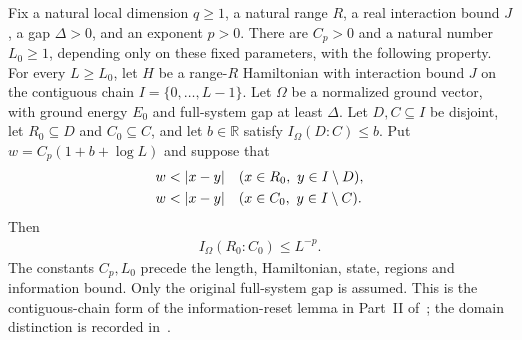 \begin{lemma}
    \label{thm:chain_information_reset}
    \leanok
    Fix a natural local dimension $q\ge1$, a natural range $R$, a real
    interaction bound $J$, a gap $\Delta>0$, and an exponent $p>0$.
    There are $C_p>0$ and a natural number $L_0\ge1$, depending only on
    these fixed parameters, with the following property.
    For every $L\ge L_0$, let $H$ be a range-$R$ Hamiltonian with
    interaction bound $J$ on the contiguous chain $I=\{0,\ldots,L-1\}$.
    Let $\Omega$ be a normalized ground vector, with ground energy $E_0$
    and full-system gap at least $\Delta$.
    Let $D,C\subseteq I$ be disjoint, let $R_0\subseteq D$ and
    $C_0\subseteq C$, and let $b\in\mathbb R$ satisfy
    $I_\Omega(D:C)\le b$.
    Put $w=C_p(1+b+\log L)$ and suppose that
    \begin{align}
        w & <|x-y| &  & (x\in R_0,\ y\in I\setminus D),\notag \\
        w & <|x-y| &  & (x\in C_0,\ y\in I\setminus C).
    \end{align}
    Then
    \begin{align}
        I_\Omega(R_0:C_0)\le L^{-p}.
    \end{align}
    The constants $C_p,L_0$ precede the length, Hamiltonian, state,
    regions and information bound. Only the original full-system gap
    is assumed. This is the contiguous-chain form of the information-reset
    lemma in Part~II of~\cite{TNLean2026OneDimensional}; the domain distinction
    is recorded in~\cite{gap:tnlean_one_dimensional_connected_domain_scope}.
    
\end{lemma}
